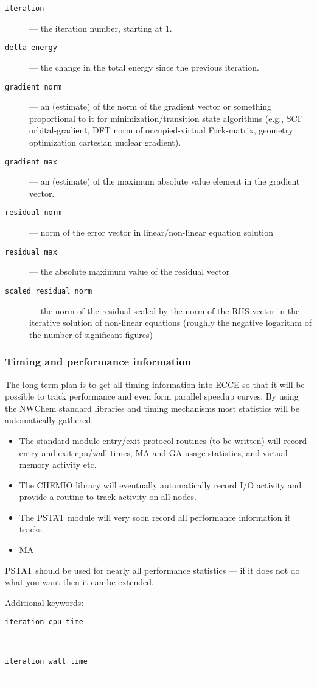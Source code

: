 \begin{description}
\item [\verb+iteration+] --- the iteration number, starting at 1.
\item [\verb+delta energy+] --- the change in the total energy since
  the previous iteration.
\item [\verb+gradient norm+] --- an (estimate) of the norm of the
  gradient vector or something proportional to it for
  minimization/transition state algorithms (e.g., SCF
  orbital-gradient, DFT norm of occupied-virtual Fock-matrix, geometry
  optimization cartesian nuclear gradient).
\item [\verb+gradient max+] --- an (estimate) of the maximum absolute
  value element in the gradient vector.
\item [\verb+residual norm+] --- norm of the error vector in
  linear/non-linear equation solution
\item [\verb+residual max+] --- the absolute maximum value of the
  residual vector
\item [\verb+scaled residual norm+] --- the norm of the residual
  scaled by the norm of the RHS vector in the iterative solution of
  non-linear equations (roughly the negative logarithm of the number of
  significant figures)
\end{description}

\subsubsection{Timing and performance information}

The long term plan is to get all timing information into ECCE so that
it will be possible to track performance and even form parallel
speedup curves.  By using the NWChem standard libraries and timing
mechanisms most statistics will be automatically gathered.

\begin{itemize}
\item The standard module entry/exit protocol routines (to be written)
  will record entry and exit cpu/wall times, MA and GA usage
  statistics, and virtual memory activity etc.
\item The CHEMIO library will eventually automatically record I/O
  activity and provide a routine to track activity on all nodes.
\item The PSTAT module will very soon record all performance
  information it tracks.
\item MA 
\end{itemize}

PSTAT should be used for nearly all performance statistics --- if it
does not do what you want then it can be extended.

Additional keywords:
\begin{description}
\item [\verb+iteration cpu time+] ---
\item [\verb+iteration wall time+] ---
\end{description}

